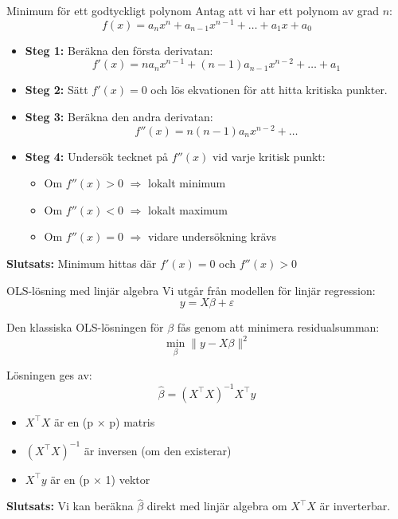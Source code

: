 \documentclass[10pt,english]{beamer}
\begin{document}
\begin{frame}{Minimum för ett godtyckligt polynom}
    Antag att vi har ett polynom av grad $n$:
    \[
    f(x) = a_n x^n + a_{n-1} x^{n-1} + \dots + a_1 x + a_0
    \]
    \begin{itemize}
        \item \textbf{Steg 1:} Beräkna den första derivatan:
        \[
        f'(x) = n a_n x^{n-1} + (n-1) a_{n-1} x^{n-2} + \dots + a_1
        \]
        \item \textbf{Steg 2:} Sätt $f'(x) = 0$ och lös ekvationen för att hitta kritiska punkter.
        \item \textbf{Steg 3:} Beräkna den andra derivatan:
        \[
        f''(x) = n(n-1) a_n x^{n-2} + \dots
        \]
        \item \textbf{Steg 4:} Undersök tecknet på $f''(x)$ vid varje kritisk punkt:
        \begin{itemize}
            \item Om $f''(x) > 0$ $\Rightarrow$ lokalt minimum
            \item Om $f''(x) < 0$ $\Rightarrow$ lokalt maximum
            \item Om $f''(x) = 0$ $\Rightarrow$ vidare undersökning krävs
        \end{itemize}
    \end{itemize}
    \textbf{Slutsats:} Minimum hittas där $f'(x) = 0$ och $f''(x) > 0$
\end{frame}


\begin{frame}{OLS-lösning med linjär algebra}
    Vi utgår från modellen för linjär regression:
    \[
    y = X\beta + \varepsilon
    \]

    \vspace{0.3cm}
    Den klassiska OLS-lösningen för $\beta$ fås genom att minimera residualsumman:
    \[
    \min_\beta \| y - X\beta \|^2
    \]

    \vspace{0.3cm}
    Lösningen ges av:
    \[
    \hat{\beta} = (X^\top X)^{-1} X^\top y
    \]

    \begin{itemize}
        \item $X^\top X$ är en (p × p) matris
        \item $(X^\top X)^{-1}$ är inversen (om den existerar)
        \item $X^\top y$ är en (p × 1) vektor
    \end{itemize}

    \textbf{Slutsats:} Vi kan beräkna $\hat{\beta}$ direkt med linjär algebra om $X^\top X$ är inverterbar.
\end{frame}
\end{document}
